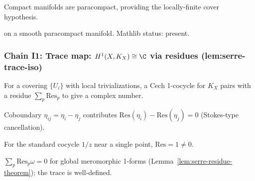 \begin{lemma}
\label{lem:dfs-r4}
Compact manifolds are paracompact, providing the locally-finite cover hypothesis.
\leanok
\end{lemma}

\begin{lemma}
\label{lem:dfs-r5}
 on a smooth paracompact manifold.  Mathlib status: present.
\leanok\mathlibok
\end{lemma}

\subsubsection*{Chain I1: Trace map: $H^{1}(X,K_{X})\cong\C$ via residues (lem:serre-trace-iso)}

\begin{lemma}
\label{lem:sti-r1}
For a covering $\{U_{i}\}$ with local trivializations, a Cech 1-cocycle for $K_{X}$ pairs with a residue $\sum_{p}\mathrm{Res}_{p}$ to give a complex number.
\leanok
\end{lemma}

\begin{lemma}
\label{lem:sti-r2}
Coboundary $\eta_{ij} = \eta_{i} - \eta_{j}$ contributes $\mathrm{Res}(\eta_{i}) - \mathrm{Res}(\eta_{j}) = 0$ (Stokes-type cancellation).
\leanok
\end{lemma}

\begin{lemma}
\label{lem:sti-r3}
For the standard cocycle $1/z$ near a single point, $\mathrm{Res} = 1 \neq 0$.
\leanok
\end{lemma}

\begin{lemma}
\label{lem:sti-r4}
$\sum_{p}\mathrm{Res}_{p}\omega = 0$ for global meromorphic 1-forms (Lemma~\ref{lem:serre-residue-theorem}); the trace is well-defined.
\leanok
\end{lemma}

